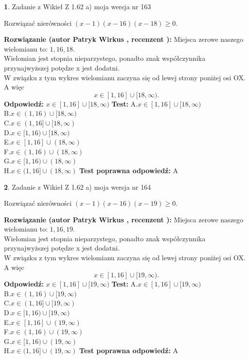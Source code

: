 \documentclass[12pt, a4paper]{article}
\theoremstyle{definition} %
\newtheorem{zad}{}
\newcommand{\zadStart}[1]{\begin{zad}#1\newline}
\newcommand{\zadStop}{\end{zad}}
\newcommand{\rozwStart}[2]{\noindent \textbf{Rozwiązanie (autor #1 , recenzent #2): }\newline}
\newcommand{\rozwStop}{\newline}
\newcommand{\odpStart}{\noindent \textbf{Odpowiedź:}\newline}
\newcommand{\odpStop}{\newline}
\newcommand{\testStart}{\noindent \textbf{Test:}\newline}
\newcommand{\testStop}{\newline}
\newcommand{\kluczStart}{\noindent \textbf{Test poprawna odpowiedź:}\newline}
\newcommand{\kluczStop}{\newline}
\begin{document}
\zadStart{Zadanie z Wikieł Z 1.62 a) moja wersja nr 163}

Rozwiązać nierówności $(x-1)(x-16)(x-18)\ge0$.
\zadStop
\rozwStart{Patryk Wirkus}{}
Miejsca zerowe naszego wielomianu to: $1, 16, 18$.\\
Wielomian jest stopnia nieparzystego, ponadto znak współczynnika przy\linebreak najwyższej potędze x jest dodatni.\\ W związku z tym wykres wielomianu zaczyna się od lewej strony poniżej osi OX. A więc $$x \in [1,16] \cup [18,\infty).$$
\rozwStop
\odpStart
$x \in [1,16] \cup [18,\infty)$
\odpStop
\testStart
A.$x \in [1,16] \cup [18,\infty)$\\
B.$x \in (1,16) \cup [18,\infty)$\\
C.$x \in (1,16] \cup [18,\infty)$\\
D.$x \in [1,16) \cup [18,\infty)$\\
E.$x \in [1,16] \cup (18,\infty)$\\
F.$x \in (1,16) \cup (18,\infty)$\\
G.$x \in [1,16) \cup (18,\infty)$\\
H.$x \in (1,16] \cup (18,\infty)$
\testStop
\kluczStart
A
\kluczStop



\zadStart{Zadanie z Wikieł Z 1.62 a) moja wersja nr 164}

Rozwiązać nierówności $(x-1)(x-16)(x-19)\ge0$.
\zadStop
\rozwStart{Patryk Wirkus}{}
Miejsca zerowe naszego wielomianu to: $1, 16, 19$.\\
Wielomian jest stopnia nieparzystego, ponadto znak współczynnika przy\linebreak najwyższej potędze x jest dodatni.\\ W związku z tym wykres wielomianu zaczyna się od lewej strony poniżej osi OX. A więc $$x \in [1,16] \cup [19,\infty).$$
\rozwStop
\odpStart
$x \in [1,16] \cup [19,\infty)$
\odpStop
\testStart
A.$x \in [1,16] \cup [19,\infty)$\\
B.$x \in (1,16) \cup [19,\infty)$\\
C.$x \in (1,16] \cup [19,\infty)$\\
D.$x \in [1,16) \cup [19,\infty)$\\
E.$x \in [1,16] \cup (19,\infty)$\\
F.$x \in (1,16) \cup (19,\infty)$\\
G.$x \in [1,16) \cup (19,\infty)$\\
H.$x \in (1,16] \cup (19,\infty)$
\testStop
\kluczStart
A
\kluczStop
\end{document}
